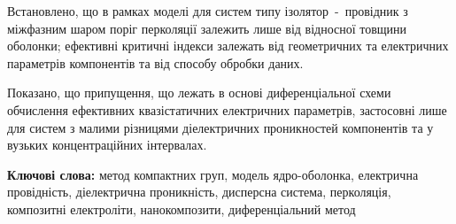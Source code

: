 \documentclass[twoside,a4paper,14pt]{vakaref-utf8}
\begin{document}
Встановлено, що в рамках моделі для систем типу ізолятор~-~провідник з міжфазним шаром поріг перколяції залежить лише від відносної товщини оболонки; ефективні критичні індекси залежать від геометричних та електричних параметрів компонентів та від способу обробки даних. 

Показано, що припущення, що лежать в основі диференціальної схеми обчислення ефективних квазістатичних електричних параметрів, застосовні лише для систем з малими різницями діелектричних проникностей компонентів та у вузьких концентраційних інтервалах.

\vskip 10pt
\textbf{Ключові слова:} метод компактних груп, модель ядро-оболонка, електрична провідність, діелектрична проникність, дисперсна система, перколяція, композитні електроліти, нанокомпозити, диференціальний метод


\bigskip
\end{document}
